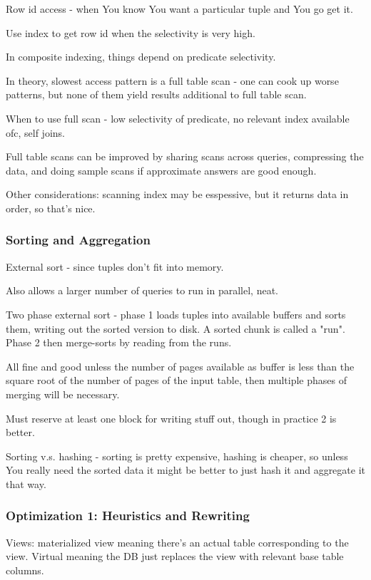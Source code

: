 \documentclass{article}
\begin{document}
			Row id access - when You know You want a particular tuple and You go get it.
			
			Use index to get row id when the selectivity is very high.
			
			In composite indexing, things depend on predicate selectivity.
			
			In theory, slowest access pattern is a full table scan - one can cook up worse patterns, but none of them yield results additional to full table scan.
			
			When to use full scan - low selectivity of predicate, no relevant index available ofc, self joins.
			
			Full table scans can be improved by sharing scans across queries, compressing the data, and doing sample scans if approximate answers are good enough.
			
			Other considerations: scanning index may be esspessive, but it returns data in order, so that's nice.
			
		\subsubsection{Sorting and Aggregation}
		
			External sort - since tuples don't fit into memory.
			
			Also allows a larger number of queries to run in parallel, neat.
			
			Two phase external sort - phase 1 loads tuples into available buffers and sorts them, writing out the sorted version to disk. A sorted chunk is called a "run". Phase 2 then merge-sorts by reading from the runs.
			
			All fine and good unless the number of pages available as buffer is less than the square root of the number of pages of the input table, then multiple phases of merging will be necessary.
			
			Must reserve at least one block for writing stuff out, though in practice 2 is better.
			
			Sorting v.s. hashing - sorting is pretty expensive, hashing is cheaper, so unless You really need the sorted data it might be better to just hash it and aggregate it that way.
			
		\subsubsection{Optimization 1: Heuristics and Rewriting}
		
			Views: materialized view meaning there's an actual table corresponding to the view. Virtual meaning the DB just replaces the view with relevant base table columns. 
			
\end{document}

